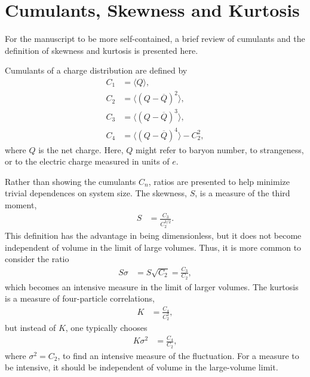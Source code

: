 
\section{Cumulants, Skewness and Kurtosis}\label{sec:cumulants}

For the manuscript to be more self-contained, a brief review of cumulants and the definition of skewness and kurtosis is presented here.

Cumulants of a charge distribution are defined by 
\begin{align}
C_1 &= \langle Q\rangle,\\
C_2 &= \langle(Q-\overline{Q})^2\rangle,\\
C_3 &= \langle(Q-\overline{Q})^3\rangle,\\
C_4 &= \langle(Q-\overline{Q})^4\rangle-C_2^2,
\end{align}
where $Q$ is the net charge. Here, $Q$ might refer to baryon number, to strangeness, or to the electric charge measured in units of $e$.

Rather than showing the cumulants $C_n$, ratios are presented to help minimize trivial dependences on system size. The skewness, $S$, is a measure of the third moment,
\begin{eqnarray}
S&=\frac{C_3}{C_2^{3/2}}.
\end{eqnarray}
This definition has the advantage in being dimensionless, but it does not become independent of volume in the limit of large volumes. Thus, it is more common to consider the ratio
\begin{eqnarray}
S\sigma&=S\sqrt{C_2}=\frac{C_3}{C_2},
\end{eqnarray}
which becomes an intensive measure in the limit of larger volumes. The kurtosis is a measure of four-particle correlations,
\begin{eqnarray}
K&=\frac{C_4}{C_2^2},
\end{eqnarray}
but instead of $K$, one typically chooses
\begin{eqnarray}
K\sigma^2&=\frac{C_4}{C_2},
\end{eqnarray}
where $\sigma^2=C_2$, to find an intensive measure of the fluctuation. For a measure to be intensive, it should be independent of volume in the large-volume limit.

